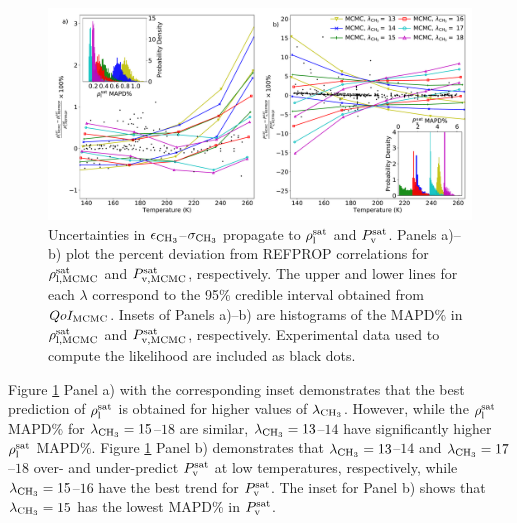 \documentclass[preprint,letterpaper,floatfix,citeautoscript,aip,jcp]{revtex4-1}
\begin{document}
\begin{figure}[htb!]
	\centering
	\includegraphics[width=6.4in]{MCMC_ethane_VLE}
	\caption{Uncertainties in $\epsilon_{\rm CH_3}$--$\sigma_{\rm CH_3}$ propagate to $\rho_{\rm l}^{\rm sat}$ and $P_{\rm v}^{\rm sat}$. Panels a)--b) plot the percent deviation from REFPROP correlations for $\rho_{\rm l, MCMC}^{\rm sat}$ and $P_{\rm v, MCMC}^{\rm sat}$, respectively. The upper and lower lines for each $\lambda$ correspond to the 95\% credible interval obtained from $QoI_{\rm MCMC}$. Insets of Panels a)--b) are histograms of the MAPD\% in $\rho_{\rm l, MCMC}^{\rm sat}$ and $P_{\rm v, MCMC}^{\rm sat}$, respectively. Experimental data used to compute the likelihood are included as black dots.}
	\label{fig:MCMC_ethane_VLE}
\end{figure}

Figure \ref{fig:MCMC_ethane_VLE} Panel a) with the corresponding inset demonstrates that the best prediction of $\rho_{\rm l}^{\rm sat}$ is obtained for higher values of $\lambda_{\rm CH_3}$. However, while the $\rho_{\rm l}^{\rm sat}$ MAPD\% for $\lambda_{\rm CH_3} = 15$--$18$ are similar, $\lambda_{\rm CH_3} = 13$--$14$ have significantly higher $\rho_{\rm l}^{\rm sat}$ MAPD\%. Figure \ref{fig:MCMC_ethane_VLE} Panel b) demonstrates that $\lambda_{\rm CH_3} = 13$--$14$ and $\lambda_{\rm CH_3} = 17$--$18$ over- and under-predict $P_{\rm v}^{\rm sat}$ at low temperatures, respectively, 
while $\lambda_{\rm CH_3} = 15$--$16$ have the best trend for $P_{\rm v}^{\rm sat}$. The inset for Panel b) shows that $\lambda_{\rm CH_3} = 15$ has the lowest MAPD\% in $P_{\rm v}^{\rm sat}$.
\end{document}

